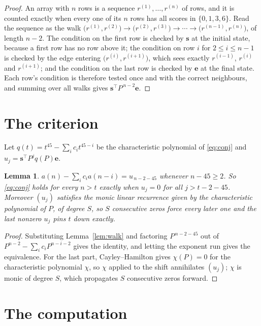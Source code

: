 \documentclass[11pt,a4paper]{article}
\theoremstyle{plain}
\newtheorem{lemma}[theorem]{Lemma}
\theoremstyle{definition}
\begin{document}
\begin{proof}
An array with $n$ rows is a sequence $r^{(1)},\dots,r^{(n)}$ of rows, and it is counted
exactly when every one of its $n$ rows has all scores in $\{0,1,3,6\}$. Read the sequence as the
walk $\bigl(r^{(1)},r^{(2)}\bigr)\to\bigl(r^{(2)},r^{(3)}\bigr)\to\cdots\to
\bigl(r^{(n-1)},r^{(n)}\bigr)$, of length $n-2$. The condition on the first row is
checked by $\mathbf{s}$ at the initial state, because a first row has no row above it; the
condition on row $i$ for $2\le i\le n-1$ is checked by the edge entering
$\bigl(r^{(i)},r^{(i+1)}\bigr)$, which sees exactly $r^{(i-1)}$, $r^{(i)}$ and
$r^{(i+1)}$; and the condition on the last row is checked by $\mathbf{e}$ at the final
state. Each row's condition is therefore tested once and with the correct neighbours, and
summing over all walks gives $\mathbf{s}^{\!\top}P^{\,n-2}\mathbf{e}$.
\end{proof}

\section{The criterion}

Let $q(t)=t^{45}-\sum_i c_i t^{45-i}$ be the characteristic polynomial of
\eqref{eq:conj} and $u_j=\mathbf{s}^{\!\top}P^{j}q(P)\mathbf{e}$.

\begin{lemma}\label{lem:crit}
$a(n)-\sum_i c_i a(n-i)=u_{\,n-2-45}$ whenever $n-45\ge2$. So \eqref{eq:conj}
holds for every $n>t$ exactly when $u_j=0$ for all $j>t-2-45$. Moreover $(u_j)$
satisfies the monic linear recurrence given by the characteristic polynomial of $P$, of
degree $S$, so $S$ consecutive zeros force every later one and the last nonzero $u_j$ pins
$t$ down exactly.
\end{lemma}

\begin{proof}
Substituting Lemma~\ref{lem:walk} and factoring $P^{\,n-2-45}$ out of
$P^{n-2}-\sum_i c_i P^{n-i-2}$ gives the identity, and letting the exponent run gives the
equivalence. For the last part, Cayley--Hamilton gives $\chi(P)=0$ for the characteristic
polynomial $\chi$, so $\chi$ applied to the shift annihilates $(u_j)$; $\chi$ is monic of
degree $S$, which propagates $S$ consecutive zeros forward.
\end{proof}

\section{The computation}
\end{document}

